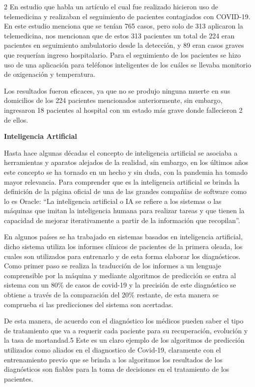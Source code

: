 \documentclass[12pt,spanish,Letterpaper,openany]{book}
\begin{document}
\begin {multicols}{2}
En estudio que habla un artículo el cual fue realizado hicieron uso de telemedicina y realizaban el
seguimiento de pacientes contagiados con COVID-19. En este estudio menciona que se tenían 765
casos, pero solo de 313 aplicaron la telemedicina, nos mencionan que de estos 313 pacientes un
total de 224 eran pacientes en seguimiento ambulatorio desde la detección, y 89 eran casos graves
que requerían ingreso hospitalario. Para el seguimiento de los pacientes se hizo uso de una
aplicación para teléfonos inteligentes de los cuáles se llevaba monitorio de oxigenación y
temperatura.

Los resultados fueron eficaces, ya que no se produjo ninguna muerte en sus domicilios de los 224
pacientes mencionados anteriormente, sin embargo, ingresaron 18 pacientes al hospital con un
estado más grave donde fallecieron 2 de ellos.

\textbf{Inteligencia Artificial}

Hasta hace algunas décadas el concepto de inteligencia artificial se asociaba a herramientas y
aparatos alejados de la realidad, sin embargo, en los últimos años este concepto se ha tornado en
un hecho y sin duda, con la pandemia ha tomado mayor relevancia. Para comprender que es la
inteligencia artificial se brinda la definición de la página oficial de una de las grandes compañías
de software como lo es Oracle: ``La inteligencia artificial o IA se refiere a los sistemas o las
máquinas que imitan la inteligencia humana para realizar tareas y que tienen la capacidad de
mejorar iterativamente a partir de la información que recopilan''.

En algunos países se ha trabajado en sistemas basados en inteligencia artificial, dicho sistema
utiliza los informes clínicos de pacientes de la primera oleada, los cuales son utilizados para
entrenarlo y de esta forma elaborar los diagnósticos. Como primer paso se realiza la traducción de
los informes a un lenguaje comprensible por la máquina y mediante algoritmos de predicción se
entra al sistema con un 80\% de casos de covid-19 y la precisión de este diagnóstico se obtiene a
través de la comparación del 20\% restante, de esta manera se comprueba si las predicciones del
sistema son acertadas.

De esta manera, de acuerdo con el diagnóstico los médicos pueden saber el tipo de tratamiento que
va a requerir cada paciente para su recuperación, evolución y la tasa de mortandad.5 Este es un
claro ejemplo de los algoritmos de predicción utilizados como aliados en el diagnostico de Covid-19,
claramente con el entrenamiento previo que se brinda a los algoritmos los resultados de los
diagnósticos son fiables para la toma de decisiones en el tratamiento de los pacientes.


\end{multicols}
\end{document}

